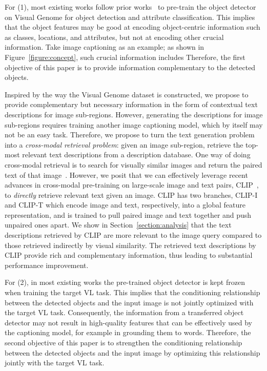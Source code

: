 \documentclass[10pt,twocolumn,letterpaper]{article}
\begin{document}
For (1), most existing works follow prior works~\cite{anderson2018bottom} to pre-train the object detector on Visual Genome for object detection and attribute classification.
This implies that the object features may be good at encoding object-centric information such as classes, locations, and attributes, but not at encoding other crucial information.
Take image captioning as an example; as shown in Figure~\ref{figure:concept}, such crucial information includes 
Therefore, the first objective of this paper is to provide information complementary to the detected objects.

Inspired by the way the Visual Genome dataset is constructed, we propose to provide complementary but necessary information in the form of contextual text descriptions for image sub-regions.
However, generating the descriptions for image sub-regions requires training another image captioning model, which by itself may not be an easy task.
Therefore, we propose to turn the text generation problem into a \textit{cross-modal retrieval problem}: given an image sub-region, retrieve the top- most relevant text descriptions from a description database.
One way of doing cross-modal retrieval is to search for visually similar images and return the paired text of that image~\cite{gong2014improving,hodosh2013framing,ordonez2011im2text,sun2015automatic}.
However, we posit that we can effectively leverage 
recent advances in cross-modal pre-training on large-scale image and text pairs, CLIP~\cite{Radford2021LearningTV}, to \textit{directly} retrieve relevant text given an image. CLIP has two branches, CLIP-I and CLIP-T which encode image and text, respectively, into a global feature representation, and is trained to pull paired image and text together and push unpaired ones apart.
We show in Section~\ref{section:analysis} that the text descriptions retrieved by CLIP are more relevant to the image query compared to those retrieved indirectly by visual similarity.
The retrieved text descriptions by CLIP provide rich and complementary information,  thus leading to substantial performance improvement.

For (2), in most existing works the pre-trained object detector is kept frozen when training the target VL task.
This implies that the conditioning relationship between the detected objects and the input image is not jointly optimized with the target VL task.
Consequently, the information from a transferred object detector may not result in high-quality features that can be effectively used by the captioning model, for example in grounding them to words. Therefore, the second objective of this paper is to strengthen the conditioning relationship between the detected objects and the input image by optimizing this relationship jointly with the target VL task.
\end{document}
